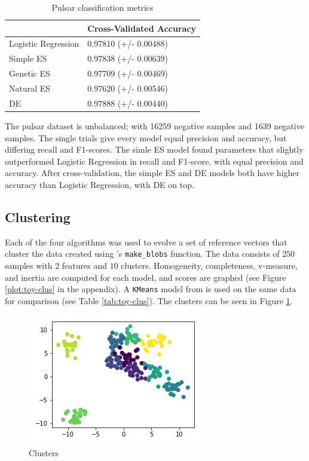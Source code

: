 \documentclass[conference]{IEEEtran}
\begin{document}
\begin{table}[htbp]
\centering
\begin{tabular}{ll}
\hline
 & Cross-Validated Accuracy \\ \hline
Logistic Regression & 0.97810 (+/- 0.00488) \\
Simple ES & 0.97838 (+/- 0.00639) \\
Genetic ES & 0.97709 (+/- 0.00469) \\
Natural ES & 0.97620 (+/- 0.00546) \\
DE & 0.97888 (+/- 0.00440) \\ \hline
\end{tabular}
\caption{Pulsar classification metrics}
\label{tab:pul-class2}
\end{table}

The pulsar dataset is unbalanced; with 16259 negative samples and 1639 negative samples. The single trials give every model equal precision and 
accuracy, but differing recall and F1-scores. The simle ES model found parameters that slightly outperformed Logistic Regression in recall and 
F1-score, with equal precision and accuracy. After cross-validation, the simple ES and DE models both have higher accuracy than Logistic Regression, 
with DE on top.

\subsection{Clustering}
Each of the four algorithms was used to evolve a set of reference vectors that cluster the data created using \cite{scikit}'s \texttt{make\_blobs} 
function. The data consists of $250$ samples with $2$ features and $10$ clusters. Homogeneity, completeness, v-measure, and inertia are computed 
for each model, and scores are graphed (see Figure \ref{plot:toy-clus} in the appendix). A \texttt{KMeans} model from \cite{scikit} is used on the same 
data for comparison (see Table \ref{tab:toy-clus}). The clusters can be seen in Figure \ref{plot:clus}.

\begin{figure}[htbp]
\centering
\includegraphics[width=.4\textwidth]{Toy-Clusters.png}
\caption{Clusters}
\label{plot:clus}
\end{figure}
\end{document}
